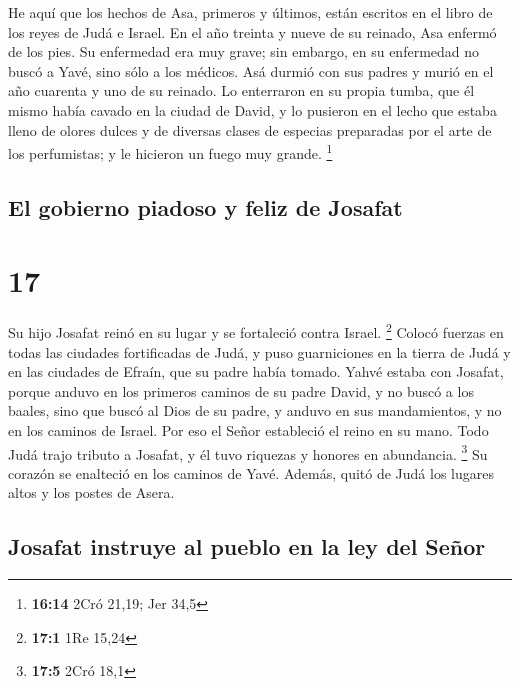  He aquí que los hechos de Asa, primeros y últimos, están
escritos en el libro de los reyes de Judá e Israel.  En
el año treinta y nueve de su reinado, Asa enfermó de los pies. Su
enfermedad era muy grave; sin embargo, en su enfermedad no buscó a Yavé,
sino sólo a los médicos.  Asá durmió con sus padres y
murió en el año cuarenta y uno de su reinado.  Lo
enterraron en su propia tumba, que él mismo había cavado en la ciudad de
David, y lo pusieron en el lecho que estaba lleno de olores dulces y de
diversas clases de especias preparadas por el arte de los perfumistas; y
le hicieron un fuego muy grande. \footnote{\textbf{16:14} 2Cró 21,19;
  Jer 34,5}

\hypertarget{el-gobierno-piadoso-y-feliz-de-josafat}{%
\subsection{El gobierno piadoso y feliz de
Josafat}\label{el-gobierno-piadoso-y-feliz-de-josafat}}

\hypertarget{section-16}{%
\section{17}\label{section-16}}

 Su hijo Josafat reinó en su lugar y se fortaleció contra
Israel. \footnote{\textbf{17:1} 1Re 15,24}  Colocó fuerzas
en todas las ciudades fortificadas de Judá, y puso guarniciones en la
tierra de Judá y en las ciudades de Efraín, que su padre había tomado.
 Yahvé estaba con Josafat, porque anduvo en los primeros
caminos de su padre David, y no buscó a los baales,  sino
que buscó al Dios de su padre, y anduvo en sus mandamientos, y no en los
caminos de Israel.  Por eso el Señor estableció el reino
en su mano. Todo Judá trajo tributo a Josafat, y él tuvo riquezas y
honores en abundancia. \footnote{\textbf{17:5} 2Cró 18,1} 
Su corazón se enalteció en los caminos de Yavé. Además, quitó de Judá
los lugares altos y los postes de Asera.

\hypertarget{josafat-instruye-al-pueblo-en-la-ley-del-seuxf1or}{%
\subsection{Josafat instruye al pueblo en la ley del
Señor}\label{josafat-instruye-al-pueblo-en-la-ley-del-seuxf1or}}

